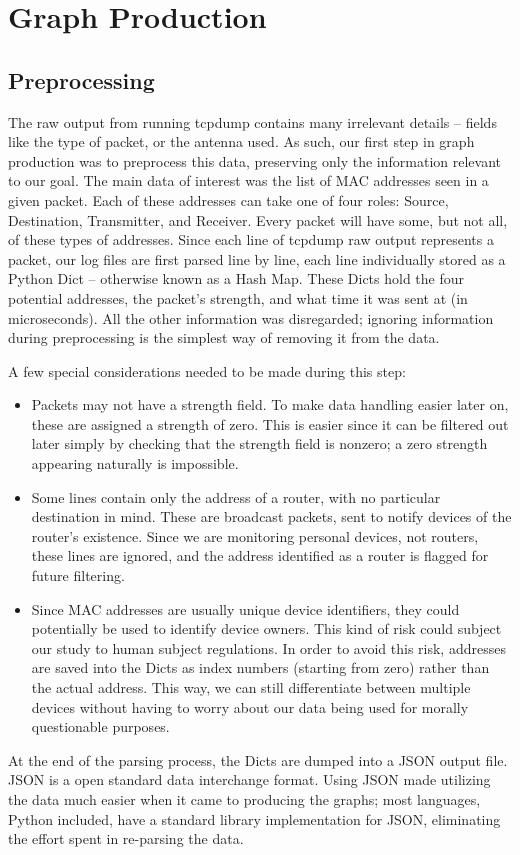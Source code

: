 \section{Graph Production}

\subsection*{Preprocessing}

The raw output from running tcpdump contains many irrelevant details -- fields like the type of packet, or the antenna used.
As such, our first step in graph production was to preprocess this data, preserving only the information relevant to our goal.
The main data of interest was the list of MAC addresses seen in a given packet.
Each of these addresses can take one of four roles: Source, Destination, Transmitter, and Receiver.
Every packet will have some, but not all, of these types of addresses.
Since each line of tcpdump raw output represents a packet, our log files are first parsed line by line, each line individually stored as a Python Dict -- otherwise known as a Hash Map.
These Dicts hold the four potential addresses, the packet's strength, and what time it was sent at (in microseconds).
All the other information was disregarded; ignoring information during preprocessing is the simplest way of removing it from the data.

A few special considerations needed to be made during this step:
\begin{itemize}
\item Packets may not have a strength field.
  To make data handling easier later on, these are assigned a strength of zero.
  This is easier since it can be filtered out later simply by checking that the strength field is nonzero; a zero strength appearing naturally is impossible. 
\item Some lines contain only the address of a router, with no particular destination in mind.
  These are broadcast packets, sent to notify devices of the router's existence.
  Since we are monitoring personal devices, not routers, these lines are ignored, and the address identified as a router is flagged for future filtering.
\item Since MAC addresses are usually unique device identifiers, they could potentially be used to identify device owners.
  This kind of risk could subject our study to human subject regulations.
  In order to avoid this risk, addresses are saved into the Dicts as index numbers (starting from zero) rather than the actual address.
  This way, we can still differentiate between multiple devices without having to worry about our data being used for morally questionable purposes.
\end{itemize}
At the end of the parsing process, the Dicts are dumped into a JSON output file.
JSON is a open standard data interchange format.
Using JSON made utilizing the data much easier when it came to producing the graphs; most languages, Python included, have a standard library implementation for JSON, eliminating the effort spent in re-parsing the data. %

